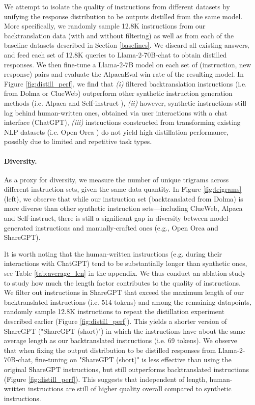 We attempt to isolate the quality of instructions from different datasets by unifying the response distribution to be outputs distilled from the same model. More specifically, we randomly sample 12.8K instructions from our backtranslation data (with and without filtering) as well as from each of the baseline datasets described in Section \ref{baselines}. We discard all existing answers, and feed each set of 12.8K queries to Llama-2-70B-chat to obtain distilled responses. We then fine-tune a Llama-2-7B model on each set of (instruction, new response) pairs and evaluate the AlpacaEval win rate of the resulting model. In Figure \ref{fig:distill_perf}, we find that \textit{(i)} filtered backtranslation instructions (i.e. from Dolma or ClueWeb) outperform other synthetic instruction generation methods (i.e. Alpaca \cite{taori2023alpaca} and Self-instruct \cite{wang2022self}), \textit{(ii)} however, synthetic instructions still lag behind human-written ones, obtained via user interactions with a chat interface (ChatGPT), \textit{(iii)} instructions constructed from transforming existing NLP datasets (i.e. Open Orca \cite{OpenOrca,mukherjee2023orca}) do not yield high distillation performance, possibly due to limited and repetitive task types.
\vspace{-0.25em}
\paragraph{Diversity.}
As a proxy for diversity, we measure the number of unique trigrams across different instruction sets, given the same data quantity. In Figure \ref{fig:trigrams} (left), we observe that while our instruction set (backtranslated from Dolma) is more diverse than other synthetic instruction sets---including ClueWeb, Alpaca and Self-instruct, there is still a significant gap in diversity between model-generated instructions and manually-crafted ones (e.g., Open Orca and ShareGPT).

It is worth noting that the human-written instructions (e.g. during their interactions with ChatGPT) tend to be substantially longer than synthetic ones, see Table \ref{tab:average_len} in the appendix. We thus conduct an ablation study to study how much the length factor contributes to the quality of instructions. We filter out instructions in ShareGPT that exceed the maximum length of our backtranslated instructions (i.e. 514 tokens) and among the remaining datapoints, randomly sample 12.8K instructions to repeat the distillation experiment described earlier (Figure \ref{fig:distill_perf}). This yields a shorter version of ShareGPT ("ShareGPT (short)") in which the instructions have about the same average length as our backtranslated instructions (i.e. 69 tokens). We observe that when fixing the output distribution to be distilled responses from Llama-2-70B-chat, fine-tuning on "ShareGPT (short)" is less effective than using the original ShareGPT instructions, but still outperforms backtranslated instructions (Figure \ref{fig:distill_perf}). This suggests that independent of length, human-written instructions are still of higher quality overall compared to synthetic instructions.
\vspace{-0.25em}
